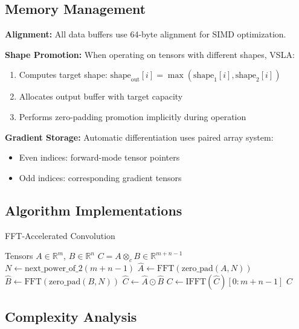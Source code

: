 \documentclass[sigconf,review]{acmart}
\begin{document}
\subsection{Memory Management}

\begin{tcolorbox}[colback=memory,colframe=red!50!black,title=Memory Model]
\textbf{Alignment:} All data buffers use 64-byte alignment for SIMD optimization.

\textbf{Shape Promotion:} When operating on tensors with different shapes, VSLA:
\begin{enumerate}
\item Computes target shape: $\text{shape}_{\text{out}}[i] = \max(\text{shape}_1[i], \text{shape}_2[i])$
\item Allocates output buffer with target capacity
\item Performs zero-padding promotion implicitly during operation
\end{enumerate}

\textbf{Gradient Storage:} Automatic differentiation uses paired array system:
\begin{itemize}
\item Even indices: forward-mode tensor pointers
\item Odd indices: corresponding gradient tensors
\end{itemize}
\end{tcolorbox}

\subsection{Algorithm Implementations}

\begin{algorithm}
\caption{FFT-Accelerated Convolution}
\begin{algorithmic}[1]
\REQUIRE Tensors $A \in \mathbb{R}^{m}$, $B \in \mathbb{R}^{n}$
\ENSURE $C = A \otimes_c B \in \mathbb{R}^{m+n-1}$
\STATE $N \leftarrow \text{next\_power\_of\_2}(m + n - 1)$
\STATE $\hat{A} \leftarrow \text{FFT}(\text{zero\_pad}(A, N))$
\STATE $\hat{B} \leftarrow \text{FFT}(\text{zero\_pad}(B, N))$
\STATE $\hat{C} \leftarrow \hat{A} \odot \hat{B}$ 
\STATE $C \leftarrow \text{IFFT}(\hat{C})[0:m+n-1]$ 
\RETURN $C$
\end{algorithmic}
\end{algorithm}

\subsection{Complexity Analysis}
\end{document}
